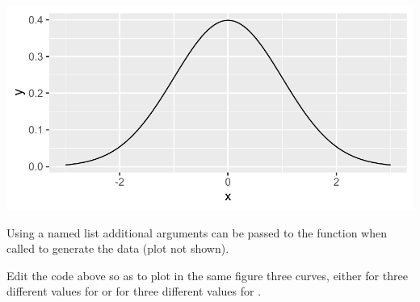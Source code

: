 \documentclass[krantz2]{krantz}\usepackage{knitr}
\begin{document}
\begin{knitrout}\footnotesize
{}\color{fgcolor}\begin{kframe}
\begin{alltt}
\hlstd{(} \hlstd{=} \hlstd{(} \hlstd{=} \hlstd{(}\hlopt{-}\hlstd{,}\hlstd{)),}
        \hlstd{=} \hlstd{(}  \hlopt{+}
  \hlstd{(} 
\end{alltt}
\end{kframe}

{\centering \includegraphics[width=.7\textwidth]{figure/pos-function-plot-01-1} 

}


\end{knitrout}

Using a named list additional arguments can be passed to the function when called to generate the data (plot not shown).

\begin{knitrout}\footnotesize
{}\color{fgcolor}\begin{kframe}
\begin{alltt}
\hlstd{(} \hlstd{=} \hlstd{(} \hlstd{=} \hlstd{(}\hlopt{-}\hlstd{,}\hlstd{)),}
        \hlstd{=} \hlstd{(}  \hlopt{+}
  \hlstd{(}   \hlstd{=} \hlstd{(} \hlstd{=} \hlstd{,}  \hlstd{=} \hlstd{))}
\end{alltt}
\end{kframe}
\end{knitrout}

\begin{playground}
Edit the code above so as to plot in the same figure three curves, either for three different values for  or for three different values for .
\end{playground}
\end{document}
